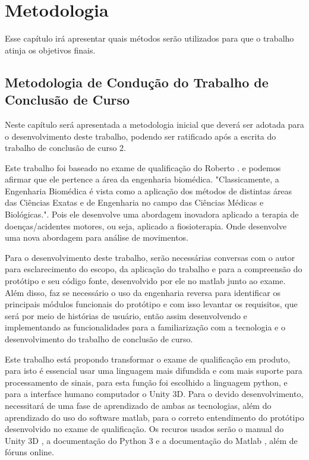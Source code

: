 
\chapter[Metodologia]{Metodologia}
  Esse capítulo irá apresentar quais métodos serão utilizados para que o trabalho
atinja os objetivos finais.
\section{Metodologia de Condução do Trabalho de Conclusão de Curso}
\label{Sec:MetCondTCC}
  Neste capítulo será apresentada a metodologia inicial que deverá ser adotada
para o desenvolvimento deste trabalho, podendo ser ratificado após a escrita do
trabalho de conclusão de curso 2.

  Este trabalho foi baseado no exame de qualificação do Roberto \cite{roberto}.
e podemos afirmar que ele pertence a área da engenharia biomédica. "Classicamente, 
a Engenharia Biomédica é vista como a aplicação dos métodos de distintas áreas 
das Ciências Exatas e de Engenharia no campo das Ciências Médicas e 
Biológicas."\cite{engenhariaBiomedica}. Pois ele desenvolve uma abordagem 
inovadora aplicado a terapia de  doenças/acidentes motores, ou seja, aplicado a
 fiosioterapia. Onde desenvolve uma nova abordagem para análise de movimentos.

  Para o desenvolvimento deste trabalho, serão necessárias conversas com 
o autor para esclarecimento do escopo, da aplicação do trabalho e para a compreensão
do protótipo e seu código fonte, desenvolvido por ele no matlab junto ao exame. 
Além disso, faz se necessário o uso da engenharia reversa para identificar os 
principais módulos funcionais do protótipo e com isso levantar os requisitos, 
que será por meio de histórias de usuário, então assim desenvolvendo e 
implementando as funcionalidades para a familiarização com a tecnologia e o 
desenvolvimento do trabalho de conclusão de curso.
  
   Este trabalho está propondo transformar o exame de qualificação \cite{roberto}
em produto, para isto é essencial usar uma linguagem mais difundida e com mais 
suporte para processamento de sinais, para esta função foi escolhido a
linguagem python, e para a interface humano computador o Unity 3D\cite{unity3d}. 
Para o devido desenvolvimento, necessitará de uma fase de aprendizado de ambas 
as tecnologias, além do aprendizado do uso do software matlab, para o correto
entendimento do protótipo desenvolvido no exame de qualificação. Os recuros 
usados serão o manual do Unity 3D \cite{unity3dManual}, a documentação do 
Python 3 \cite{pythondoc} e a documentação do Matlab \cite{matlabdoc}, além de 
fóruns online.

